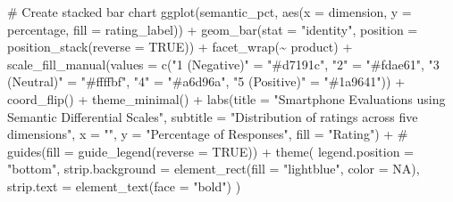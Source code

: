 \documentclass[
  letterpaper,
  DIV=11,
  numbers=noendperiod]{scrartcl}
\newenvironment{Shaded}{\begin{snugshade}}{\end{snugshade}}
\newcommand{\AttributeTok}[1]{\textcolor[rgb]{0.40,0.45,0.13}{#1}}
\newcommand{\CommentTok}[1]{\textcolor[rgb]{0.37,0.37,0.37}{#1}}
\newcommand{\ConstantTok}[1]{\textcolor[rgb]{0.56,0.35,0.01}{#1}}
\newcommand{\FunctionTok}[1]{\textcolor[rgb]{0.28,0.35,0.67}{#1}}
\newcommand{\NormalTok}[1]{\textcolor[rgb]{0.00,0.23,0.31}{#1}}
\newcommand{\OtherTok}[1]{\textcolor[rgb]{0.00,0.23,0.31}{#1}}
\newcommand{\SpecialCharTok}[1]{\textcolor[rgb]{0.37,0.37,0.37}{#1}}
\newcommand{\StringTok}[1]{\textcolor[rgb]{0.13,0.47,0.30}{#1}}
\begin{document}
\begin{Shaded}
\begin{Highlighting}[]
\CommentTok{\# Create stacked bar chart}
\FunctionTok{ggplot}\NormalTok{(semantic\_pct, }\FunctionTok{aes}\NormalTok{(}\AttributeTok{x =}\NormalTok{ dimension, }\AttributeTok{y =}\NormalTok{ percentage, }\AttributeTok{fill =}\NormalTok{ rating\_label)) }\SpecialCharTok{+}
  \FunctionTok{geom\_bar}\NormalTok{(}\AttributeTok{stat =} \StringTok{"identity"}\NormalTok{, }\AttributeTok{position =} \FunctionTok{position\_stack}\NormalTok{(}\AttributeTok{reverse =} \ConstantTok{TRUE}\NormalTok{)) }\SpecialCharTok{+}
  \FunctionTok{facet\_wrap}\NormalTok{(}\SpecialCharTok{\textasciitilde{}}\NormalTok{ product) }\SpecialCharTok{+}
  \FunctionTok{scale\_fill\_manual}\NormalTok{(}\AttributeTok{values =} \FunctionTok{c}\NormalTok{(}\StringTok{"1 (Negative)"} \OtherTok{=} \StringTok{"\#d7191c"}\NormalTok{,}
                               \StringTok{"2"} \OtherTok{=} \StringTok{"\#fdae61"}\NormalTok{,}
                               \StringTok{"3 (Neutral)"} \OtherTok{=} \StringTok{"\#ffffbf"}\NormalTok{,}
                               \StringTok{"4"} \OtherTok{=} \StringTok{"\#a6d96a"}\NormalTok{,}
                               \StringTok{"5 (Positive)"} \OtherTok{=} \StringTok{"\#1a9641"}\NormalTok{)) }\SpecialCharTok{+}
  \FunctionTok{coord\_flip}\NormalTok{() }\SpecialCharTok{+}
  \FunctionTok{theme\_minimal}\NormalTok{() }\SpecialCharTok{+}
  \FunctionTok{labs}\NormalTok{(}\AttributeTok{title =} \StringTok{"Smartphone Evaluations using Semantic Differential Scales"}\NormalTok{,}
       \AttributeTok{subtitle =} \StringTok{"Distribution of ratings across five dimensions"}\NormalTok{,}
       \AttributeTok{x =} \StringTok{""}\NormalTok{,}
       \AttributeTok{y =} \StringTok{"Percentage of Responses"}\NormalTok{,}
       \AttributeTok{fill =} \StringTok{"Rating"}\NormalTok{) }\SpecialCharTok{+}
  \CommentTok{\# guides(fill = guide\_legend(reverse = TRUE)) +}
  \FunctionTok{theme}\NormalTok{(}
    \AttributeTok{legend.position =} \StringTok{"bottom"}\NormalTok{,}
    \AttributeTok{strip.background =} \FunctionTok{element\_rect}\NormalTok{(}\AttributeTok{fill =} \StringTok{"lightblue"}\NormalTok{, }\AttributeTok{color =} \ConstantTok{NA}\NormalTok{),}
    \AttributeTok{strip.text =} \FunctionTok{element\_text}\NormalTok{(}\AttributeTok{face =} \StringTok{"bold"}\NormalTok{)}
\NormalTok{  )}
\end{Highlighting}
\end{Shaded}
\end{document}

